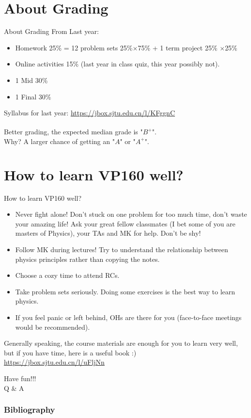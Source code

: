 \documentclass{beamer}
\begin{document}
\section{About Grading}
\begin{frame}{About Grading}
  From Last year:
  \begin{itemize}
    \item Homework 25\% =  12 problem sets 25\%$\times $75\% + 1 term project 25\% $\times $25\%
    \item Online activities 15\% (last year in class quiz, this year possibly not).
    \item 1 Mid 30\%
    \item 1 Final 30\%
  \end{itemize}
    Syllabus for last year: \underline{\small{\url{https://jbox.sjtu.edu.cn/l/KFggnC}}}\\
    ~\\
    Better grading, the expected median grade is "$B^+$".\\
    Why? A larger chance of getting an "$A$" or "$A^+$".
    \end{frame}

\section{How to learn VP160 well?}
\begin{frame}{How to learn VP160 well?}
    \begin{itemize}
      \item Never fight alone! Don't stuck on one problem for too much time, don't waste your amazing life! Ask your great fellow classmates (I bet some of you are masters of Physics), your TAs and MK for help. Don't be shy!
      \item Follow MK during lectures! Try to understand the relationship between physics principles rather than copying the notes.
      \item Choose a cozy time to attend RCs.
      \item Take problem sets seriously. Doing some exercises is the best way to learn physics.
      \item If you feel panic or left behind, OHs are there for you (face-to-face meetings would be recommended).
    \end{itemize}
\end{frame}

\begin{frame}
  Generally speaking, the course materials are enough for you to learn very well, but if you have time, here is a useful book :)\\
  \underline{\small{\url{https://jbox.sjtu.edu.cn/l/uFljNn}}}
\end{frame}
\begin{frame}
  \centering
  \huge{Have fun!!!}\\
  \huge{Q \& A}
\end{frame}
\renewcommand{\bibfont}{\footnotesize}
\frametitle{Bibliography}




\end{document}
